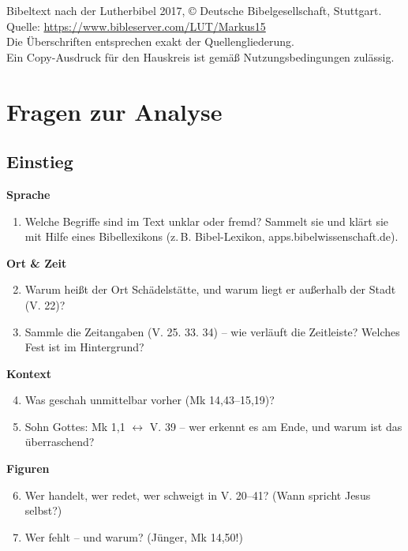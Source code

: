 \documentclass[12pt,a4paper]{article}
\begin{document}
\vspace{1em}
{\footnotesize Bibeltext nach der Lutherbibel 2017, © Deutsche Bibelgesellschaft, Stuttgart.\\
Quelle: \url{https://www.bibleserver.com/LUT/Markus15}\\
Die Überschriften entsprechen exakt der Quellengliederung.\\
Ein Copy-Ausdruck für den Hauskreis ist gemäß Nutzungsbedingungen zulässig.}

\vspace{1.5em}

\newpage

\section*{Fragen zur Analyse}

\subsection*{Einstieg}

\textbf{Sprache}
\begin{enumerate}
  \item Welche Begriffe sind im Text unklar oder fremd? Sammelt sie und klärt sie mit Hilfe eines Bibellexikons (z.\,B. Bibel-Lexikon, apps.bibelwissenschaft.de).
\end{enumerate}

\textbf{Ort \& Zeit}
\begin{enumerate}\setcounter{enumi}{1}
  \item Warum heißt der Ort \glqq Schädelstätte\grqq{}, und warum liegt er außerhalb der Stadt (V. 22)?
  \item Sammle die Zeitangaben (V. 25. 33. 34) -- wie verläuft die Zeitleiste? Welches Fest ist im Hintergrund?
\end{enumerate}

\textbf{Kontext}
\begin{enumerate}\setcounter{enumi}{3}
  \item Was geschah unmittelbar vorher (Mk 14,43--15,19)?
  \item \glqq Sohn Gottes\grqq{}: Mk 1,1 $\leftrightarrow$ V. 39 -- wer erkennt es am Ende, und warum ist das überraschend?
\end{enumerate}

\textbf{Figuren}
\begin{enumerate}\setcounter{enumi}{5}
  \item Wer handelt, wer redet, wer schweigt in V. 20--41? (Wann spricht Jesus selbst?)
  \item Wer fehlt -- und warum? (Jünger, Mk 14,50!)
\end{enumerate}
\end{document}
